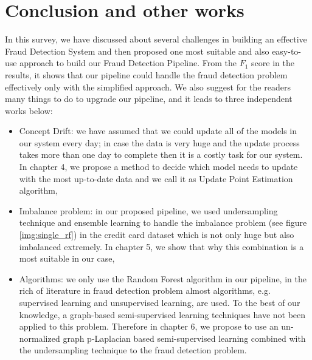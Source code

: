 \section{Conclusion and other works}

In this survey, we have discussed about several challenges in building an effective Fraud Detection System and then proposed one most suitable and also easy-to-use approach to build our Fraud Detection Pipeline. From the $F_1$ score in the results, it shows that our pipeline could handle the fraud detection problem effectively only with the simplified approach. We also suggest for the readers many things to do to upgrade our pipeline, and it leads to three independent works below:

\begin{itemize}
\item Concept Drift: we have assumed that we could update all of the models in our system every day; in case the data is very huge and the update process takes more than one day to complete then it is a costly task for our system. In chapter 4, we propose a method to decide which model needs to update with the most up-to-date data and we call it as Update Point Estimation algorithm,
\item Imbalance problem: in our proposed pipeline, we used undersampling technique and ensemble learning to handle the imbalance problem (see figure \ref{img:single_rf}) in the credit card dataset which is not only huge but also imbalanced extremely. In chapter 5, we show that why this combination is a most suitable in our case,
\item Algorithms: we only use the Random Forest algorithm in our pipeline, in the rich of literature in fraud detection problem almost algorithms, e.g. supervised learning and unsupervised learning, are used. To the best of our knowledge, a graph-based semi-supervised learning techniques have not been applied to this problem. Therefore in chapter 6, we propose to use an un-normalized graph p-Laplacian based semi-supervised learning combined with the undersampling technique to the fraud detection problem.
\end{itemize}

